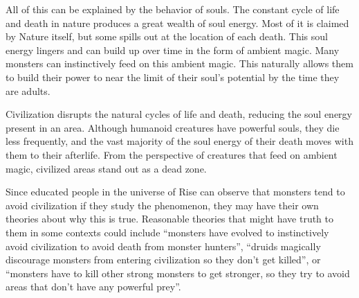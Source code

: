             All of this can be explained by the behavior of souls.
            The constant cycle of life and death in nature produces a great wealth of soul energy.
            Most of it is claimed by Nature itself, but some spills out at the location of each death.
            This soul energy lingers and can build up over time in the form of ambient magic.
            Many monsters can instinctively feed on this ambient magic.
            This naturally allows them to build their power to near the limit of their soul's potential by the time they are adults.

            Civilization disrupts the natural cycles of life and death, reducing the soul energy present in an area.
            Although humanoid creatures have powerful souls, they die less frequently, and the vast majority of the soul energy of their death moves with them to their afterlife.
            From the perspective of creatures that feed on ambient magic, civilized areas stand out as a dead zone.

            Since educated people in the universe of Rise can observe that monsters tend to avoid civilization if they study the phenomenon, they may have their own theories about why this is true.
            Reasonable theories that might have truth to them in some contexts could include ``monsters have evolved to instinctively avoid civilization to avoid death from monster hunters'', ``druids magically discourage monsters from entering civilization so they don't get killed'', or ``monsters have to kill other strong monsters to get stronger, so they try to avoid areas that don't have any powerful prey''.
